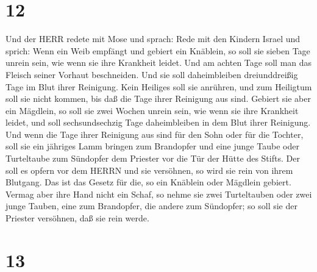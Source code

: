 \hypertarget{section-11}{%
\section{12}\label{section-11}}

 Und der HERR redete mit Mose und sprach:  Rede
mit den Kindern Israel und sprich: Wenn ein Weib empfängt und gebiert
ein Knäblein, so soll sie sieben Tage unrein sein, wie wenn sie ihre
Krankheit leidet.  Und am achten Tage soll man das Fleisch
seiner Vorhaut beschneiden.  Und sie soll daheimbleiben
dreiunddreißig Tage im Blut ihrer Reinigung. Kein Heiliges soll sie
anrühren, und zum Heiligtum soll sie nicht kommen, bis daß die Tage
ihrer Reinigung aus sind.  Gebiert sie aber ein Mägdlein, so
soll sie zwei Wochen unrein sein, wie wenn sie ihre Krankheit leidet,
und soll sechsundsechzig Tage daheimbleiben in dem Blut ihrer Reinigung.
 Und wenn die Tage ihrer Reinigung aus sind für den Sohn
oder für die Tochter, soll sie ein jähriges Lamm bringen zum Brandopfer
und eine junge Taube oder Turteltaube zum Sündopfer dem Priester vor die
Tür der Hütte des Stifts.  Der soll es opfern vor dem HERRN
und sie versöhnen, so wird sie rein von ihrem Blutgang. Das ist das
Gesetz für die, so ein Knäblein oder Mägdlein gebiert. 
Vermag aber ihre Hand nicht ein Schaf, so nehme sie zwei Turteltauben
oder zwei junge Tauben, eine zum Brandopfer, die andere zum Sündopfer;
so soll sie der Priester versöhnen, daß sie rein werde.

\hypertarget{section-12}{%
\section{13}\label{section-12}}

